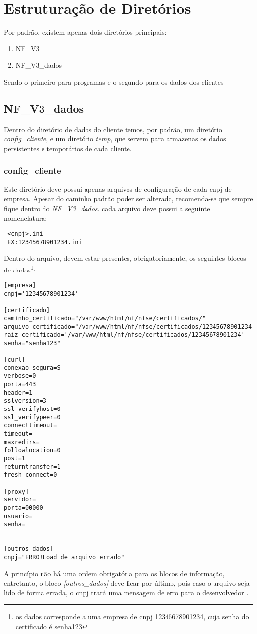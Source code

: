 \documentclass[a4paper]{article}
\newcommand{\cnpj}{12345678901234}
\newcommand{\senha}{senha123}
\newcommand{\dev}{desenvolvedor }
\begin{document}
\section{Estruturação de Diretórios}
Por padrão, existem apenas dois diretórios principais:
\begin{enumerate}
	\item NF\_V3
	\item NF\_V3\_dados
\end{enumerate}
Sendo o primeiro para programas e o segundo para os dados dos clientes



\subsection{NF\_V3\_dados}
Dentro do diretório de dados do cliente temos, por padrão, um diretório \emph{config\_cliente}, e um diretório \emph{temp}, que servem para armazenas os dados persistentes e temporários de cada cliente.

\subsubsection{config\_cliente}
 Este diretório deve possui apenas arquivos de configuração de cada cnpj de empresa. Apesar do caminho padrão poder ser alterado, recomenda-se que sempre fique dentro do \emph{NF\_V3\_dados}. cada arquivo deve possui a seguinte nomenclatura:
 \begin{verbatim}
 <cnpj>.ini
 EX:12345678901234.ini
 \end{verbatim}
Dentro do arquivo, devem estar presentes, obrigatoriamente, os seguintes blocos de dados\footnote{os dados corresponde a uma empresa de cnpj \cnpj, cuja senha do certificado é \senha}:

\begin{lstlisting}
[empresa]
cnpj='12345678901234'

[certificado]
caminho_certificado="/var/www/html/nf/nfse/certificados/"
arquivo_certificado="/var/www/html/nf/nfse/certificados/12345678901234.pfx"
raiz_certificado='/var/www/html/nf/nfse/certificados/12345678901234'
senha="senha123"

[curl]
conexao_segura=S
verbose=0
porta=443
header=1
sslversion=3
ssl_verifyhost=0
ssl_verifypeer=0
connecttimeout=
timeout=
maxredirs=
followlocation=0
post=1
returntransfer=1
fresh_connect=0

[proxy]
servidor=
porta=00000
usuario=
senha=


[outros_dados]
cnpj="ERRO!Load de arquivo errado"
\end{lstlisting}
A princípio não há uma ordem obrigatória para os blocos de informação, entretanto, o bloco \emph{[outros\_dados]} deve ficar por último, pois caso o arquivo seja lido de forma errada, o cnpj trará uma mensagem de erro para o \dev.
\end{document}
